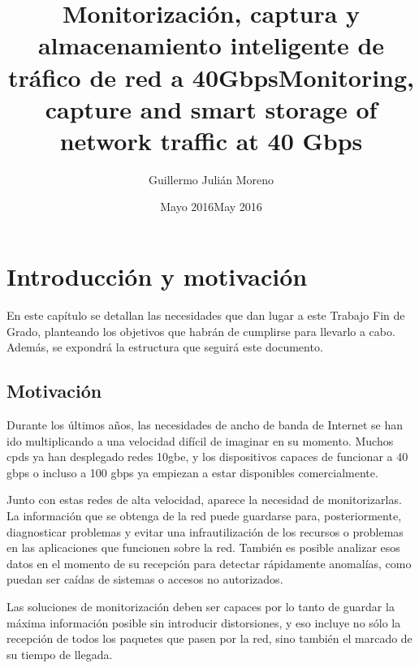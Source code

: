 \documentclass[twoside, 12pt, draft]{epstfg}
\title[spa]{Monitorización, captura y almacenamiento inteligente de tráfico de red a 40Gbps}
\title[eng]{Monitoring, capture and smart storage of network traffic at 40 Gbps}
\author{Guillermo Julián Moreno}
\date[spa]{Mayo 2016}
\date[eng]{May 2016}
\begin{document}

\frontmatter

\maketitle[spa]
\maketitle[eng]

\makeinnertitle[spa]
\makeinnertitle[eng]

\makeabstract[spa]
\makeabstract[eng]

\tableofcontents
\clearsidepage
\listoftables
\clearsidepage
\listoffigures
\clearsidepage

\mainmatter

\chapter{Introducción y motivación}

En este capítulo se detallan las necesidades que dan lugar a este Trabajo Fin de Grado, planteando los objetivos que habrán de cumplirse para llevarlo a cabo. Además, se expondrá la estructura que seguirá este documento.

\section{Motivación}

Durante los últimos años, las necesidades de ancho de banda de Internet se han ido multiplicando a una velocidad difícil de imaginar en su momento. Muchos \glspl{cpd} ya han desplegado redes \gls{10gbe}, y los dispositivos capaces de funcionar a 40 \gls{gbps} o incluso a 100 \gls{gbps} ya empiezan a estar disponibles comercialmente.

Junto con estas redes de alta velocidad, aparece la necesidad de monitorizarlas. La información que se obtenga de la red puede guardarse para, posteriormente, diagnosticar problemas y evitar una infrautilización de los recursos o problemas en las aplicaciones que funcionen sobre la red. También es posible analizar esos datos en el momento de su recepción para detectar rápidamente anomalías, como puedan ser caídas de sistemas o accesos no autorizados.

Las soluciones de monitorización deben ser capaces por lo tanto de guardar la máxima información posible sin introducir distorsiones, y eso incluye no sólo la recepción de todos los paquetes que pasen por la red, sino también el marcado de su tiempo de llegada.
\end{document}
